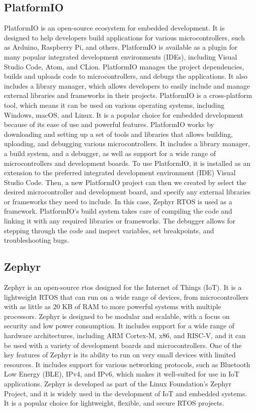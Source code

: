 \subsection{PlatformIO}
PlatformIO is an open-source ecosystem for embedded development. It is designed to help developers build applications for various microcontrollers, such as Arduino, Raspberry Pi, and others. PlatformIO is available as a plugin for many popular integrated development environments (IDEs), including Visual Studio Code, Atom, and CLion. PlatformIO manages the project dependencies, builds and uploads code to microcontrollers, and debugs the applications. It also includes a library manager, which allows developers to easily include and manage external libraries and frameworks in their projects. PlatformIO is a cross-platform tool, which means it can be used on various operating systems, including Windows, macOS, and Linux. It is a popular choice for embedded development because of its ease of use and powerful features. PlatformIO works by downloading and setting up a set of tools and libraries that allows building, uploading, and debugging various microcontrollers. It includes a library manager, a build system, and a debugger, as well as support for a wide range of microcontrollers and development boards. To use PlatformIO, it is installed as an extension to the preferred integrated development environment (IDE) Visual Studio Code. Then, a new PlatformIO project can then we created by select the desired microcontroller and development board, and specify any external libraries or frameworks they need to include. In this case, Zephyr RTOS is used as a framework. PlatformIO's build system takes care of compiling the code and linking it with any required libraries or frameworks. The debugger allows for stepping through the code and inspect variables, set breakpoints, and troubleshooting bugs.

\subsection{Zephyr}
Zephyr is an open-source \gls{rtos} designed for the Internet of Things (IoT). It is a lightweight RTOS that can run on a wide range of devices, from microcontrollers with as little as 20 KB of RAM to more powerful systems with multiple processors. Zephyr is designed to be modular and scalable, with a focus on security and low power consumption. It includes support for a wide range of hardware architectures, including ARM Cortex-M, x86, and RISC-V, and it can be used with a variety of development boards and microcontrollers. One of the key features of Zephyr is its ability to run on very small devices with limited resources. It includes support for various networking protocols, such as Bluetooth Low Energy (BLE), IPv4, and IPv6, which makes it well-suited for use in IoT applications. Zephyr is developed as part of the Linux Foundation's Zephyr Project, and it is widely used in the development of IoT and embedded systems. It is a popular choice for lightweight, flexible, and secure RTOS projects.

